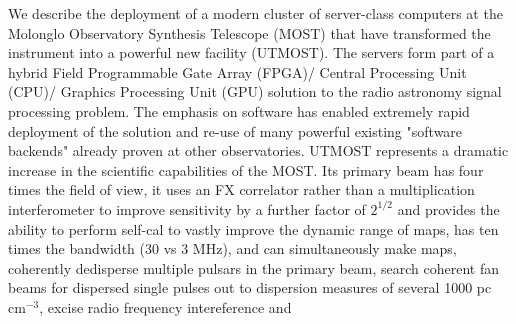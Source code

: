 We describe the deployment of a modern cluster of server-class computers at the Molonglo Observatory Synthesis Telescope (MOST) that have transformed the instrument into a powerful new facility (UTMOST). The servers form part of a hybrid Field Programmable Gate Array (FPGA)/ Central Processing Unit (CPU)/ Graphics Processing Unit (GPU) solution to the radio astronomy signal processing problem. The emphasis on software has enabled extremely rapid deployment of the solution and re-use of many powerful existing "software backends" already proven at other observatories. UTMOST represents a dramatic increase in the scientific capabilities of the MOST. Its primary beam has four times the field of view, it uses an FX correlator rather than a multiplication interferometer to improve sensitivity by a further factor of $2^{1/2}$ and provides the ability to perform self-cal to vastly improve the dynamic range of maps, has ten times the bandwidth (30 vs 3 MHz), and can simultaneously make maps, coherently dedisperse multiple pulsars in the primary beam, search coherent fan beams for dispersed single pulses out to dispersion measures of several 1000 pc cm$^{-3}$, excise radio frequency intereference and 
